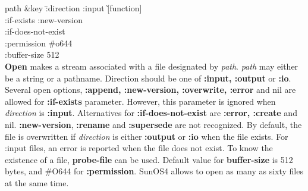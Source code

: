 \begin{refdesc}


{path \&key \= :direction :input \`[function]\\
 \> :if-exists :new-version \\
 \> :if-does-not-exist \\
 \> :permission \#o644 \\
 \> :buffer-size 512\\}{
{\bf Open} makes a stream associated with a file designated by {\em path}.
{\em path} may either be a string or a pathname.
Direction should be one of {\bf :input, :output} or {\bf :io}.
Several open options, {\bf :append, :new-version, :overwrite, :error}
and nil are allowed for {\bf :if-exists} parameter.
However, this parameter is ignored when {\em direction} is {\bf :input}.
Alternatives for {\bf :if-does-not-exist} are
{\bf :error, :create} and nil.
{\bf :new-version}, {\bf :rename} and {\bf :supersede}
are not recognized.
By default, the file is overwritten if {\em direction} is either
{\bf :output} or {\bf :io}  when the file exists.
For :input files, an error is reported when the file does not exist.
To know the existence of a file, {\bf probe-file} can be used.
Default value for {\bf buffer-size} is 512 bytes,
and \#O644 for {\bf :permission}.
SunOS4 allows to open as many as sixty files at the same time.
}




\end{refdesc}
